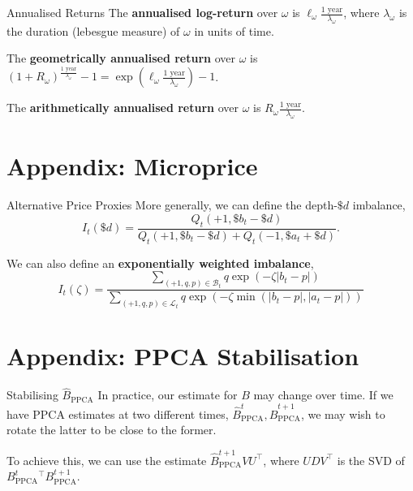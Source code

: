 \documentclass{beamer}
\begin{document}
\begin{frame}{Annualised Returns}
	The \textbf{annualised log-return} over $\omega$ is $\ell_\omega \frac{\textrm{1 year}}{\lambda_\omega}$, where $\lambda_\omega$ is the duration (lebesgue measure) of $\omega$ in units of time.%

	The \textbf{geometrically annualised return} over $\omega$ is $(1 + R_\omega)^\frac{\textrm{1 year}}{\lambda_\omega} - 1 = \exp\left(\ell_\omega \frac{\textrm{1 year}}{\lambda_\omega}\right) - 1$.

	The \textbf{arithmetically annualised return} over $\omega$ is $R_\omega \frac{\textrm{1 year}}{\lambda_\omega}$. %

\end{frame}

\section{Appendix: Microprice}
\begin{frame}{Alternative Price Proxies}
	More generally, we can define the depth-$\$d$ imbalance,
	$$I_t(\$d)=\frac{Q_t(+1,\$b_t-\$d)}{Q_t(+1,\$b_t-\$d)+Q_t(-1,\$a_t+\$d)}.$$%

	We can also define an \textbf{exponentially weighted imbalance},
	$$I_t(\zeta) = \frac{\sum_{(+1,q,p)\in\mathcal{B}_t}q\exp(-\zeta\vert b_t-p\vert)}{\sum_{(+1,q,p)\in\mathcal{L}_t}q\exp(-\zeta\min(\vert b_t-p\vert,\vert a_t-p\vert))}$$%
\end{frame}

\section{Appendix: PPCA Stabilisation}
\begin{frame}{Stabilising $\hat{B}_\textrm{PPCA}$}
	In practice, our estimate for $B$ may change over time. If we have PPCA estimates at two different times, $\hat{B}_{\textrm{PPCA}}^t,\hat{B}_{\textrm{PPCA}}^{t+1}$, we may wish to rotate the latter to be close to the former.

	To achieve this, we can use the estimate $\hat{B}_{\textrm{PPCA}}^{t+1}VU^\top$, where $UDV^\top$ is the SVD of $B_{\textrm{PPCA}}^t^\top B_{\textrm{PPCA}}^{t+1}$.%
\end{frame}
\end{document}
